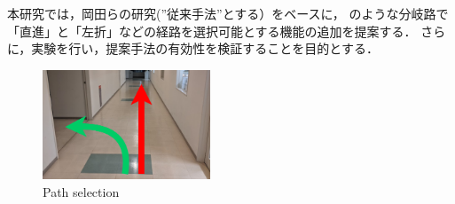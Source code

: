 \documentclass[10pt]{jarticle}
\begin{document}
    本研究では，岡田らの研究\cite{okada}(”従来手法”とする）をベースに，
    のような分岐路で「直進」と「左折」などの経路を選択可能とする機能の追加を提案する．
    さらに，実験を行い，提案手法の有効性を検証することを目的とする．

        \begin{figure}[htb]
            \centering
            \includegraphics[width=5cm]{./fig/zyuzibunki.png}
            \caption{Path selection}
            \label{fig:bunki}
        \end{figure}
    
           
\end{document}
